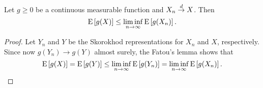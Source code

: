 \begin{corollary}
    Let $g\geq 0$ be a continuous measurable function and $X_n\overset{d}{\to} X$. Then 
    \begin{equation*}
        \operatorname{E}\left[ {g(X)} \right]\leq \liminf_{n\to\infty} \operatorname{E}\left[ {g(X_n)} \right]. 
    \end{equation*}
\end{corollary}
\begin{proof}
    Let $Y_n$ and $Y$ be the Skorokhod representations for 
    $X_n$ and $X$, respectively. Since now $g(Y_n)\to g(Y)$ 
    almost surely, the Fatou's lemma 
    shows that 
    \begin{equation*}
        \operatorname{E}\left[ {g(X)} \right] = \operatorname{E}\left[ {g(Y)} \right] 
        \leq \liminf_{n\to\infty}\operatorname{E}\left[ {g(Y_n)} \right] 
        = \liminf_{n\to\infty}\operatorname{E}\left[ {g(X_n)} \right]. 
    \end{equation*}
\end{proof}

